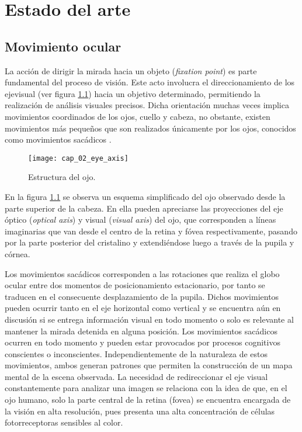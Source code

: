 \documentclass[../main.tex]{subfiles}
\begin{document}
		
\chapter{Estado del arte}
\label{cha:02_estado_del_arte}
	\section{Movimiento ocular}
	\label{sec:02_movimiento_ocular}
		La acción de dirigir la mirada hacia un objeto (\textit{fixation point}) es parte fundamental del proceso de visión. Este acto involucra el direccionamiento de los \gls{ejevisual} (ver figura \ref{fig:02_eye_axis}) hacia un objetivo determinado, permitiendo la realización de análisis visuales precisos. Dicha orientación muchas veces implica movimientos coordinados de los ojos, cuello y cabeza, no obstante, existen movimientos más pequeños que son realizados únicamente por los ojos, conocidos como movimientos sacádicos \cite{article:movOcular1, article:movOcular2}.
		\begin{figure}[H]
			\centering
			\texttt{[image: cap\_02\_eye\_axis]}
			\caption[Estructura del ojo]{Estructura del ojo\footnotemark.}
			\label{fig:02_eye_axis}
		\end{figure}

		En la figura \ref{fig:02_eye_axis} se observa un esquema simplificado del ojo observado desde la parte superior de la cabeza. En ella pueden apreciarse las proyecciones del eje óptico (\textit{optical axis}) y visual (\textit{visual axis}) del ojo, que corresponden a líneas imaginarias que van desde el centro de la retina y fóvea respectivamente, pasando por la parte posterior del cristalino y extendiéndose luego a través de la pupila y córnea.  

		Los movimientos sacádicos corresponden a las rotaciones que realiza el globo ocular entre dos momentos de posicionamiento estacionario, por tanto se traducen en el consecuente desplazamiento de la pupila. Dichos movimientos pueden ocurrir tanto en el eje horizontal como vertical y se encuentra aún en discusión \cite{article:movOcular2, article:movOcular3} si se entrega información visual en todo momento o solo es relevante al mantener la mirada detenida en alguna posición. Los movimientos sacádicos ocurren en todo momento y pueden estar provocados por procesos cognitivos conscientes o inconscientes. Independientemente de la naturaleza de estos movimientos, ambos generan patrones que permiten la construcción de un mapa mental de la escena observada. La necesidad de redireccionar el eje visual constantemente para analizar una imagen se relaciona con la idea de que, en el ojo humano, solo la parte central de la retina (\gls{fovea}) se encuentra encargada de la visión en alta resolución, pues presenta una alta concentración de células fotorreceptoras sensibles al color. 
\end{document}
